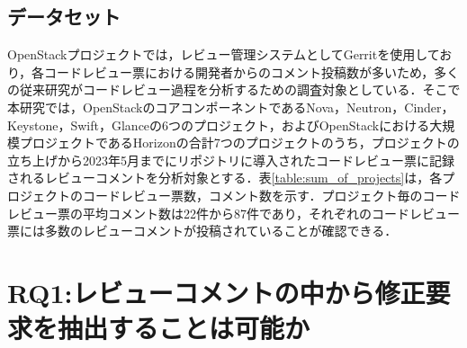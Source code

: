 \documentclass[11pt]{jreport}
\newcommand{\RQOne}{レビューコメントの中から修正要求を抽出することは可能か}
\begin{document}
\section{データセット}
OpenStackプロジェクトでは，レビュー管理システムとしてGerritを使用しており，各コードレビュー票における開発者からのコメント投稿数が多いため，多くの従来研究がコードレビュー過程を分析するための調査対象としている．そこで本研究では，OpenStackのコアコンポーネントであるNova，Neutron，Cinder，Keystone，Swift，Glanceの6つのプロジェクト，およびOpenStackにおける大規模プロジェクトであるHorizonの合計7つのプロジェクトのうち，プロジェクトの立ち上げから2023年5月までにリポジトリに導入されたコードレビュー票に記録されるレビューコメントを分析対象とする．表\ref{table:sum_of_projects}は，各プロジェクトのコードレビュー票数，コメント数を示す．プロジェクト毎のコードレビュー票の平均コメント数は22件から87件であり，それぞれのコードレビュー票には多数のレビューコメントが投稿されていることが確認できる．

\begin{table}[t]
\centering
  \caption{各プロジェクトにおいて導入されたコードレビュー票数とコメント数}
  \vspace{+1mm}
  \label{table:sum_of_projects}
\end{table}

\chapter{RQ1:\RQOne}\label{chap:RQ1}
\end{document}
